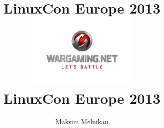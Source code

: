 \documentclass[aspectratio=169]{beamer}
\begin{document}
\title{LinuxCon Europe 2013}
\author{Maksim Melnikau}
\date{}

{
\title{
    \includegraphics[width=0.4\textwidth]{wg-logo.png}
    \\
    {\huge LinuxCon Europe 2013}
    \\
}

\begin{frame}[plain]{}
    \titlepage
\end{frame}
}

\end{document}
